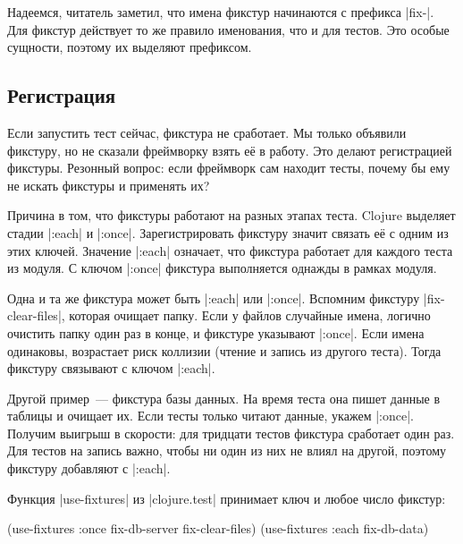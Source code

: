 Надеемся, читатель заметил, что имена фикстур начинаются с префикса
\spverb|fix-|. Для фикстур действует то же правило именования, что и для
тестов. Это особые сущности, поэтому их выделяют префиксом.

\subsection{Регистрация}


Если запустить тест сейчас, фикстура не сработает. Мы только объявили фикстуру,
но не сказали фреймворку взять е\"{е} в работу. Это делают регистрацией фикстуры.
Резонный вопрос: если фреймворк сам находит тесты, почему бы ему не искать
фикстуры и применять их?

Причина в том, что фикстуры работают на разных этапах теста. Clojure выделяет
стадии \spverb|:each| и \spverb|:once|. Зарегистрировать фикстуру значит связать
е\"{е} с одним из этих ключей. Значение \spverb|:each| означает, что фикстура
работает для каждого теста из модуля. С ключом \spverb|:once| фикстура
выполняется однажды в рамках модуля.


Одна и та же фикстура может быть \spverb|:each| или \spverb|:once|. Вспомним
фикстуру \spverb|fix-clear-files|, которая очищает папку. Если у файлов
случайные имена, логично очистить папку один раз в конце, и фикстуре указывают
\spverb|:once|. Если имена одинаковы, возрастает риск коллизии (чтение и запись
из другого теста). Тогда фикстуру связывают с ключом \spverb|:each|.

Другой пример~--- фикстура базы данных. На время теста она пишет данные в
таблицы и очищает их. Если тесты только читают данные, укажем
\spverb|:once|. Получим выигрыш в скорости: для тридцати тестов фикстура
сработает один раз. Для тестов на запись важно, чтобы ни один из них не влиял на
другой, поэтому фикстуру добавляют с \spverb|:each|.

Функция \spverb|use-fixtures| из \spverb|clojure.test| принимает ключ и любое
число фикстур:


\begin{english}
  \begin{clojure}
(use-fixtures :once fix-db-server fix-clear-files)
(use-fixtures :each fix-db-data)
  \end{clojure}
\end{english}

